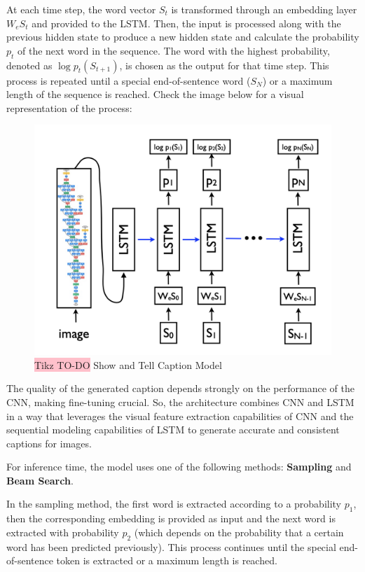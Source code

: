 At each time step, the word vector $S_t$ is transformed through an embedding layer $W_e S_t$ and provided to the LSTM. Then, the input is processed along with the previous hidden state to produce a new hidden state and calculate the probability $p_t$ of the next word in the sequence. The word with the highest probability, denoted as $\log p_t(S_{t+1})$, is chosen as the output for that time step. This process is repeated until a special end-of-sentence word ($S_N$) or a maximum length of the sequence is reached. Check the image below for a visual representation of the process:
\newpage

\begin{figure}[!htbp]
    \centering
    \includegraphics[width=\linewidth]{tikz/chapter7 - Show and Tell Model.png}
    \caption{{\color{red}\colorbox{pink}{Tikz TO-DO}} Show and Tell Caption Model}
\end{figure}

The quality of the generated caption depends strongly on the performance of the CNN, making fine-tuning crucial. So, the architecture combines CNN and LSTM in a way that leverages the visual feature extraction capabilities of CNN and the sequential modeling capabilities of LSTM to generate accurate and consistent captions for images.

For inference time, the model uses one of the following methods: \textbf{Sampling} and \textbf{Beam Search}.

In the sampling method, the first word is extracted according to a probability $p_1$, then the corresponding embedding is provided as input and the next word is extracted with probability $p_2$ (which depends on the probability that a certain word has been predicted previously). This process continues until the special end-of-sentence token is extracted or a maximum length is reached.

